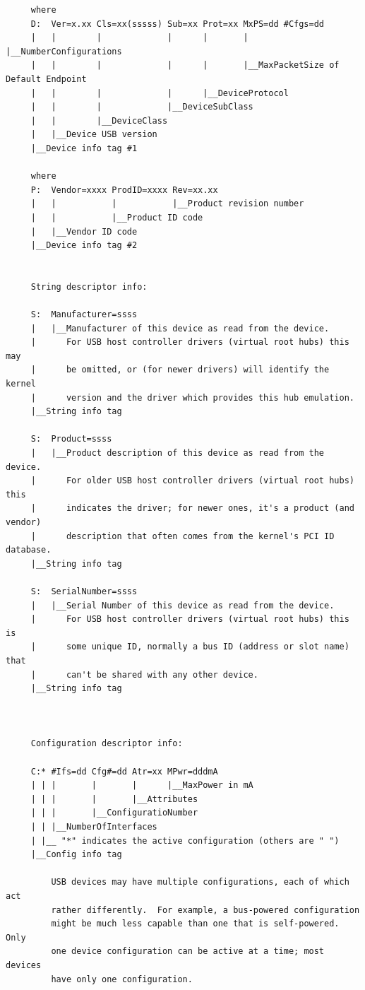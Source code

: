 {{{{{{{{{{{{{{{{{\begin{verbatim}
     where
     D:  Ver=x.xx Cls=xx(sssss) Sub=xx Prot=xx MxPS=dd #Cfgs=dd
     |   |        |             |      |       |       |__NumberConfigurations
     |   |        |             |      |       |__MaxPacketSize of Default Endpoint
     |   |        |             |      |__DeviceProtocol
     |   |        |             |__DeviceSubClass
     |   |        |__DeviceClass
     |   |__Device USB version
     |__Device info tag #1
     
     where
     P:  Vendor=xxxx ProdID=xxxx Rev=xx.xx
     |   |           |           |__Product revision number
     |   |           |__Product ID code
     |   |__Vendor ID code
     |__Device info tag #2
     
     
     String descriptor info:
     
     S:  Manufacturer=ssss
     |   |__Manufacturer of this device as read from the device.
     |      For USB host controller drivers (virtual root hubs) this may
     |      be omitted, or (for newer drivers) will identify the kernel
     |      version and the driver which provides this hub emulation.
     |__String info tag
     
     S:  Product=ssss
     |   |__Product description of this device as read from the device.
     |      For older USB host controller drivers (virtual root hubs) this
     |      indicates the driver; for newer ones, it's a product (and vendor)
     |      description that often comes from the kernel's PCI ID database.
     |__String info tag
     
     S:  SerialNumber=ssss
     |   |__Serial Number of this device as read from the device.
     |      For USB host controller drivers (virtual root hubs) this is
     |      some unique ID, normally a bus ID (address or slot name) that
     |      can't be shared with any other device.
     |__String info tag
     
     
     
     Configuration descriptor info:
     
     C:* #Ifs=dd Cfg#=dd Atr=xx MPwr=dddmA
     | | |       |       |      |__MaxPower in mA
     | | |       |       |__Attributes
     | | |       |__ConfiguratioNumber
     | | |__NumberOfInterfaces
     | |__ "*" indicates the active configuration (others are " ")
     |__Config info tag
     
         USB devices may have multiple configurations, each of which act
         rather differently.  For example, a bus-powered configuration
         might be much less capable than one that is self-powered.  Only
         one device configuration can be active at a time; most devices
         have only one configuration.
     

\end{verbatim}}}}}}}}}}}}}}}}}}
